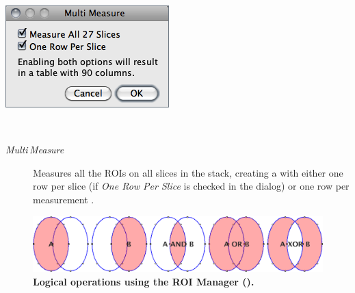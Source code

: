 \begin{minipage}[c][1\totalheight][t]{0.347\columnwidth}%
\begin{description}
\item [{\includegraphics[scale=0.55]{images/ROIManagerMultiMeasure}}]~\end{description}
%
\end{minipage}%
\begin{minipage}[c][1\totalheight][t]{0.653\columnwidth}%
\begin{description}
\item [{\emph{Multi\,Measure}}] Measures all the ROIs on all slices in
the stack, creating a  with either one
row per slice (if \emph{One Row Per Slice} is checked in the dialog)
or one row per measurement \cite{C-RM-MultiMeasure}.\end{description}
%
\end{minipage}

\begin{figure}[h]
\noindent \includegraphics[width=1\columnwidth]{images/ROIoperators}

\noindent \caption{\textbf{Logical operations using the ROI Manager (\protect{}).}}
\end{figure}

